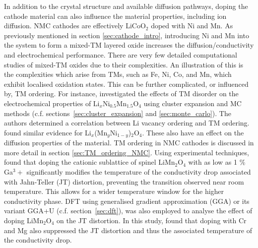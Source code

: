 \documentclass[../main.tex]{subfiles}
\begin{document}
In addition to the crystal structure and available diffusion pathways, doping the cathode material can also influence the material properties, including ion diffusion. NMC cathodes are effectively LiCoO$_2$ doped with Ni and Mn. As previously mentioned in section \ref{sec:cathode_intro}, introducing Ni and Mn into the system to form a mixed-TM layered oxide increases the diffusion/conductivity and electrochemical performance. There are very few detailed computational studies of mixed-TM oxides due to their complexities. An illustration of this is the complexities which arise from TMs, such as Fe, Ni, Co, and Mn, which exhibit localised oxidation states. This can be further complicated, or influenced by, TM ordering. For instance, \citeauthor{lee2013solid} investigated the effects of TM disorder on the electrochemical properties of Li$_x$Ni$_{0.5}$Mn$_{1.5}$O$_4$ using cluster expansion and MC methods (c.f. sections~\ref{sec:cluster_expansion} and \ref{sec:monte_carlo}). The authors determined a correlation between Li vacancy ordering and TM ordering.\cite{lee2013solid} \citeauthor{hao2016quaternary} found similar evidence for Li$_x$(Mn$_y$Ni$_{1-y}$)$_2$O$_4$.\cite{hao2016quaternary} These also have an effect on the diffusion properties of the material. TM ordering in NMC cathodes is discussed in more detail in section \ref{sec:TM_ordering_NMC}. Using experimental techniques, \citeauthor{capsoni2002inhibition} found that doping the cationic sublattice of spinel LiMn$_2$O$_4$ with as low as 1 \% Ga${^3+}$ significantly modifies the temperature of the conductivity drop associated with Jahn-Teller (JT) distortion, preventing the transition observed near room temperature. \cite{capsoni2002inhibition} This allows for a wider temperature window for the higher conductivity phase. DFT using generalised gradient approximation (GGA) or its variant GGA+U (c.f. section~\ref{sec:dft}), was also employed to analyse the effect of doping LiMn$_2$O$_4$ on the JT distortion. In this study, \citeauthor{singh2009suppression} found that doping with Cr and Mg also suppressed the JT distortion and thus the associated temperature of the conductivity drop.\cite{singh2009suppression} 
\end{document}
